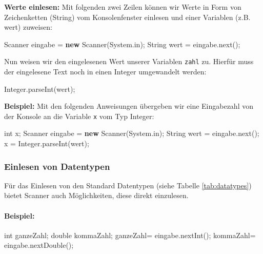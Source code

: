 \documentclass[10pt,paper=17cm:22cm, twoside=true, DIV=14]{scrbook}
\newenvironment {Shaded}
        {\begin{mdframed}[style=code] }
         {\end{mdframed}}
\newcommand{\KeywordTok}[1]{\textcolor[rgb]{0.00,0.44,0.13}{\textbf{{#1}}}}
\newcommand{\DataTypeTok}[1]{\textcolor[rgb]{0.56,0.13,0.00}{{#1}}}
\newcommand{\FunctionTok}[1]{\textcolor[rgb]{0.02,0.16,0.49}{{#1}}}
\newcommand{\NormalTok}[1]{{#1}}
\begin{document}
\textbf{Werte einlesen:} Mit folgenden zwei Zeilen können wir Werte in
Form von Zeichenketten (String) vom Konsolenfenster einlesen und einer
Variablen (z.B. wert) zuweisen:

\begin{Shaded}
\begin{Highlighting}[]
\NormalTok{Scanner eingabe = }\KeywordTok{new} \NormalTok{Scanner(System.}\FunctionTok{in}\NormalTok{);}
\NormalTok{String wert = eingabe.}\FunctionTok{next}\NormalTok{();}
\end{Highlighting}
\end{Shaded}

Nun weisen wir den eingelesenen Wert unserer Variablen \texttt{zahl} zu.
Hierfür muss der eingelesene Text noch in einen Integer umgewandelt
werden:

\begin{Shaded}
\begin{Highlighting}[]
\NormalTok{Integer.}\FunctionTok{parseInt}\NormalTok{(wert);}
\end{Highlighting}
\end{Shaded}

\textbf{Beispiel:} Mit den folgenden Anweisungen übergeben wir eine
Eingabezahl von der Konsole an die Variable \texttt{x} vom Typ Integer:

\begin{Shaded}
\begin{Highlighting}[]
\DataTypeTok{int} \NormalTok{x;}
\NormalTok{Scanner eingabe = }\KeywordTok{new} \NormalTok{Scanner(System.}\FunctionTok{in}\NormalTok{);}
\NormalTok{String wert = eingabe.}\FunctionTok{next}\NormalTok{();}
\NormalTok{x = Integer.}\FunctionTok{parseInt}\NormalTok{(wert);}
\end{Highlighting}
\end{Shaded}

\subsubsection{Einlesen von Datentypen}\label{einlesen-von-datentypen-1}

Für das Einlesen von den Standard Datentypen (siehe Tabelle
\ref{tab:datatypes}) bietet Scanner auch Möglichkeiten, diese direkt
einzulesen.

\paragraph{Beispiel:}\label{beispiel-19}

\begin{Shaded}
\begin{Highlighting}[]
\DataTypeTok{int} \NormalTok{ganzeZahl;}
\DataTypeTok{double} \NormalTok{kommaZahl;}
\NormalTok{ganzeZahl= eingabe.}\FunctionTok{nextInt}\NormalTok{();}
\NormalTok{kommaZahl= eingabe.}\FunctionTok{nextDouble}\NormalTok{();}
\end{Highlighting}
\end{Shaded}
\end{document}
